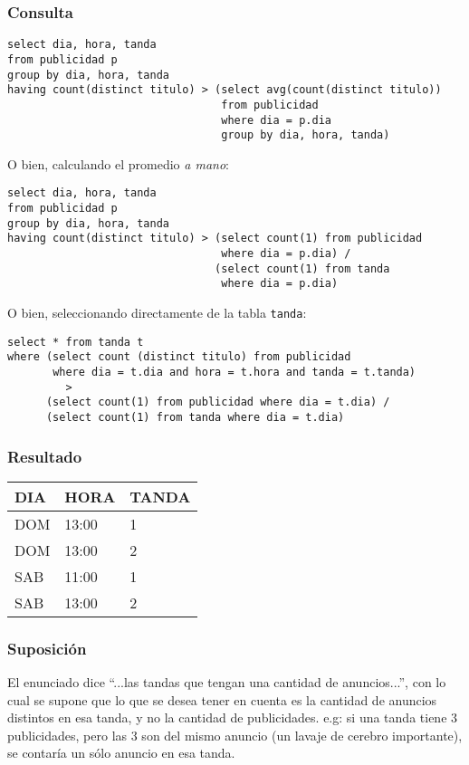 \subsubsection*{Consulta}
\begin{lstlisting} 
select dia, hora, tanda
from publicidad p
group by dia, hora, tanda
having count(distinct titulo) > (select avg(count(distinct titulo))
                                 from publicidad
                                 where dia = p.dia
                                 group by dia, hora, tanda)
\end{lstlisting}

O bien, calculando el promedio \textit{a mano}:
\begin{lstlisting}
select dia, hora, tanda
from publicidad p
group by dia, hora, tanda
having count(distinct titulo) > (select count(1) from publicidad 
                                 where dia = p.dia) /
                                (select count(1) from tanda
                                 where dia = p.dia)
\end{lstlisting}

O bien, seleccionando directamente de la tabla \lstinline|tanda|:
\begin{lstlisting}
select * from tanda t
where (select count (distinct titulo) from publicidad 
       where dia = t.dia and hora = t.hora and tanda = t.tanda) 
         > 
      (select count(1) from publicidad where dia = t.dia) /
      (select count(1) from tanda where dia = t.dia)
\end{lstlisting}

\subsubsection*{Resultado}
\begin{tabular}{|l|l|l|}
  \hline
    \bf{DIA} & \bf{HORA} & \bf{TANDA} \\ 
  \hline
    DOM & 13:00 & 1 \\
    DOM & 13:00 & 2 \\
    SAB & 11:00 & 1 \\
    SAB & 13:00 & 2 \\
  \hline
\end{tabular} 

\subsubsection*{Suposici\'on}
El enunciado dice ``...las tandas que tengan una cantidad de anuncios...'', con lo cual se supone que lo que se desea tener en cuenta es la cantidad de anuncios distintos en esa tanda, y no la cantidad de publicidades. e.g: si una tanda tiene 3 publicidades, pero las 3 son del mismo anuncio (un lavaje de cerebro importante), se contaría un sólo anuncio en esa tanda. \\

